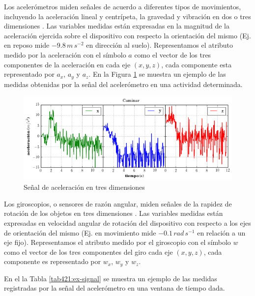 Los acelerómetros miden señales de acuerdo a diferentes tipos de movimientos,
incluyendo la aceleración lineal y centrípeta, la gravedad y vibración
en dos o tres dimensiones \cite{Goehl2007}. Las variables medidas
están expresadas en la magnitud de la aceleración ejercida sobre el
dispositivo con respecto la orientación del mismo (Ej. en reposo mide
$-9.8\,m\,s^{-2}$ en dirección al suelo). Representamos el atributo
medido por la aceleración con el símbolo $a$ como el vector de los
tres componentes de la aceleración en cada eje $(x,y,z)$, cada componente
esta representado por $a_{x}$, $a_{y}$ y $a_{z}$. En la Figura
\ref{fig421:muestra-ac} se muestra un ejemplo de las medidas obtenidas
por la señal del acelerómetro en una actividad determinada.

\begin{figure}[!tbph]
\begin{centering}
\includegraphics[width=1\columnwidth]{capitulo-4/graphics/signal_a3d}
\par\end{centering}
\caption[Señal de aceleración en tres dimensiones]{\label{fig421:muestra-ac}Señal de aceleración en tres dimensiones}
\end{figure}

Los giroscopios, o sensores de razón angular, miden señales de la
rapidez de rotación de los objetos en tres dimensiones \cite{Goehl2007}.
Las variables medidas están expresadas en velocidad angular de rotación
del dispositivo con respecto a los ejes de orientación del mismo (Ej.
en movimiento mide \foreignlanguage{english}{$-0.1\,rad\,s^{-1}$}
en relación a un eje fijo). Representamos el atributo medido por el
giroscopio con el símbolo $w$ como el vector de los tres componentes
del giro cada eje $(x,y,z)$, cada componente es representado por
$w_{x}$, $w_{y}$ y $w_{z}$. 

En el la Tabla \ref{tab421:ex-signal} se muestra un ejemplo de las
medidas registradas por la señal del acelerómetro en una ventana de
tiempo dada.

